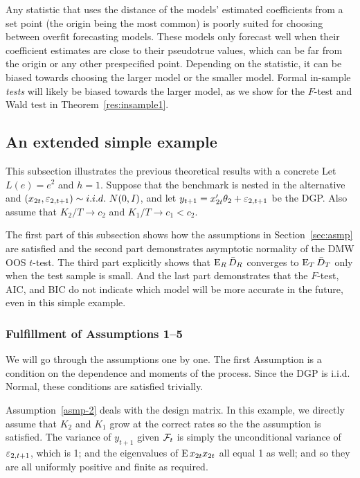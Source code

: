 \documentclass[12pt]{article}
\begin{document}
Any statistic that uses the distance of the models' estimated
coefficients from a set point (the origin being the most common) is
poorly suited for choosing between overfit forecasting models. These
models only forecast well when their coefficient estimates are close
to their pseudotrue values, which can be far from the origin or any
other prespecified
point. Depending on the statistic, it can be biased towards choosing
the larger model or the smaller model. Formal in-sample \emph{tests}
will likely be biased towards the larger model, as we show for the
$F$-test and Wald test in Theorem~\ref{res:insample1}.

\subsection{An extended simple example}
\label{sec:example}

This subsection illustrates the previous theoretical results with a
concrete Let $L(e) = e^2$ and $h = 1$. Suppose that the benchmark is
nested in the alternative and $(x_{2t}, \varepsilon_{2,t+1}) \sim i.i.d.\
N(0,I)$, and let $y_{t+1} = x_{2t}'\theta_2 + \varepsilon_{2,t+1}$
be the DGP. Also assume that $K_2/T \to c_2$ and $K_1 / T \to c_1 <
c_2$.

The first part of this subsection shows how the assumptions in
Section~\ref{sec:asmp} are satisfied and the second part
demonstrates asymptotic normality of the DMW OOS $t$-test. The third
part explicitly shows that $\operatorname{E}_R \bar{D}_{R}$ converges to $\operatorname{E}_T \bar{D}_{T}$ only
when the test sample is small. And the last part demonstrates that the
$F$-test, AIC, and BIC do not indicate which model will be more
accurate in the future, even in this simple example.

\subsubsection*{Fulfillment of Assumptions 1--5}

We will go through the assumptions one by one. The first Assumption is
a condition on the dependence and moments of the process. Since the
DGP is i.i.d. Normal, these conditions are satisfied trivially.

Assumption~\ref{asmp-2} deals with the design matrix. In this example,
we directly assume that $K_2$ and $K_1$ grow at the correct rates so
the the assumption is satisfied. The variance of $y_{t+1}$ given
$\mathcal{F}_t$ is simply the unconditional variance of $\varepsilon_{2,t+1}$, which is
1; and the eigenvalues of $\operatorname{E} x_{2t} x_{2t}$ all equal 1 as well; and
so they are all uniformly positive and finite as required.
\end{document}
